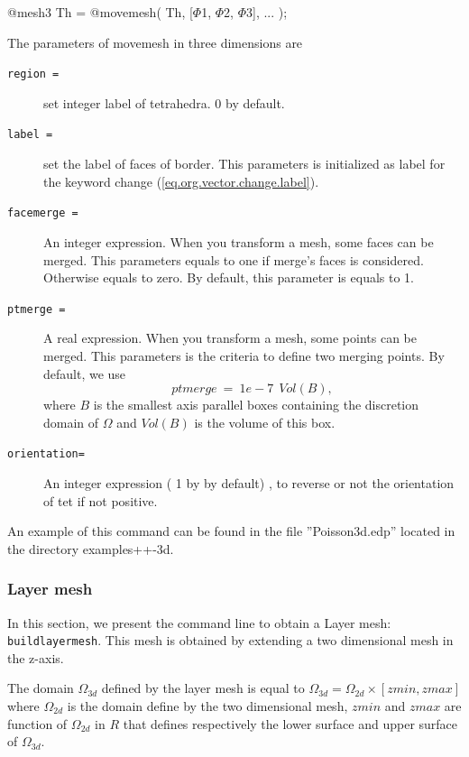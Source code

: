 \documentclass[a4paper,twoside,12pt]{book}
\begin{document}
\bFF
@mesh3 Th = @movemesh( Th, [$\Phi$1, $\Phi$2, $\Phi$3], ... );
\eFF

The parameters of movemesh in three dimensions are
\begin{description}
\item [\texttt{region  =}] set integer label of tetrahedra. 0 by default.
\item [\texttt{label =}] set the label of faces of border. This parameters is initialized as label for the keyword change (\ref{eq.org.vector.change.label}).
\item [\texttt{facemerge =}] An integer expression. When you transform a mesh, some faces can be merged. This parameters equals to one if merge's faces is considered.
Otherwise equals to zero. By default, this parameter is equals to 1.
\item [\texttt{ptmerge =}] A real expression. When you transform a mesh, some points can be merged. This parameters is the criteria to define two merging points.
By default, we use
$$
ptmerge \: = \: 1e-7 \: \:Vol( B ),
$$
where $B$ is the smallest axis parallel boxes containing the discretion domain of $\Omega$ and $Vol(B)$ is the volume of this box.
\item[\texttt{orientation=}]An integer expression ( 1 by by default) , to reverse or not the orientation of tet if not positive.  
\end{description}



An example of this command can be found in the file ''Poisson3d.edp'' located in the directory examples++-3d.


\subsubsection{Layer mesh}

In this section, we present the command line to obtain a Layer mesh: \texttt{buildlayermesh}.
This mesh is obtained by extending a two dimensional mesh in the z-axis.

The domain $\Omega_{3d}$ defined by the layer mesh is equal to $\Omega_{3d} = \Omega_{2d} \times [zmin, zmax]$
where $\Omega_{2d}$ is the domain define by the two dimensional mesh, $zmin$ and $zmax$ are function
of $\Omega_{2d}$ in $R$ that defines respectively the lower surface and upper surface of $\Omega_{3d}$.
\end{document}

